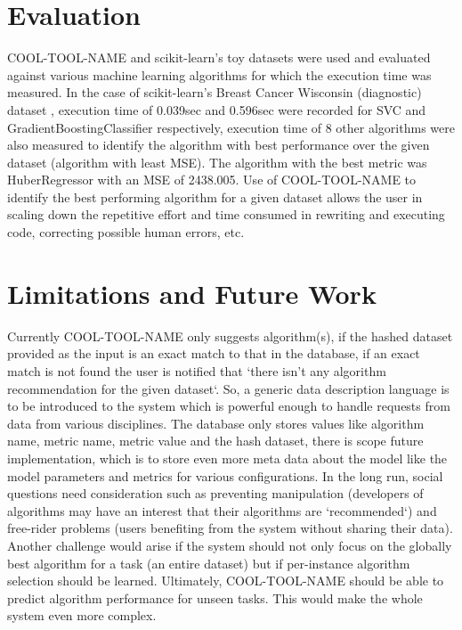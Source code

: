 \documentclass{article}
\begin{document}
\section{Evaluation}
COOL-TOOL-NAME and scikit-learn's toy datasets were used and evaluated against various machine learning algorithms for which the execution time was measured. In the case of scikit-learn’s Breast Cancer Wisconsin (diagnostic) dataset \cite{william-et-al}, execution time of 0.039sec and 0.596sec were recorded for SVC and GradientBoostingClassifier respectively, execution time of 8 other algorithms were also measured to identify the algorithm with best performance over the given dataset (algorithm with least MSE). The algorithm with the best metric was HuberRegressor with an MSE of 2438.005. Use of COOL-TOOL-NAME to identify the best performing algorithm for a given dataset allows the user in scaling down the repetitive effort and time consumed in rewriting and executing code, correcting possible human errors, etc.

\section{Limitations and Future Work}
Currently COOL-TOOL-NAME only suggests algorithm(s), if the hashed dataset provided as the input is an exact match to that in the database, if an exact match is not found the user is notified that `there isn’t any algorithm recommendation for the given dataset`. So, a generic data description language is to be introduced to the system which is powerful enough to handle requests from data from various disciplines. The database only stores values like algorithm name, metric name, metric value and the hash dataset, there is scope  future implementation, which is to store even more meta data about the model like the model parameters and metrics for various configurations. In the long run, social questions need consideration such as preventing manipulation (developers of algorithms may have an interest that their algorithms are `recommended`) and free-rider problems (users benefiting from the system without sharing their data). Another challenge would arise if the system should not only focus on the globally best algorithm for a task (an entire dataset) but if per-instance algorithm selection should be learned. Ultimately, COOL-TOOL-NAME should be able to predict algorithm performance for unseen tasks. This would make the whole system even more complex.
\end{document}
